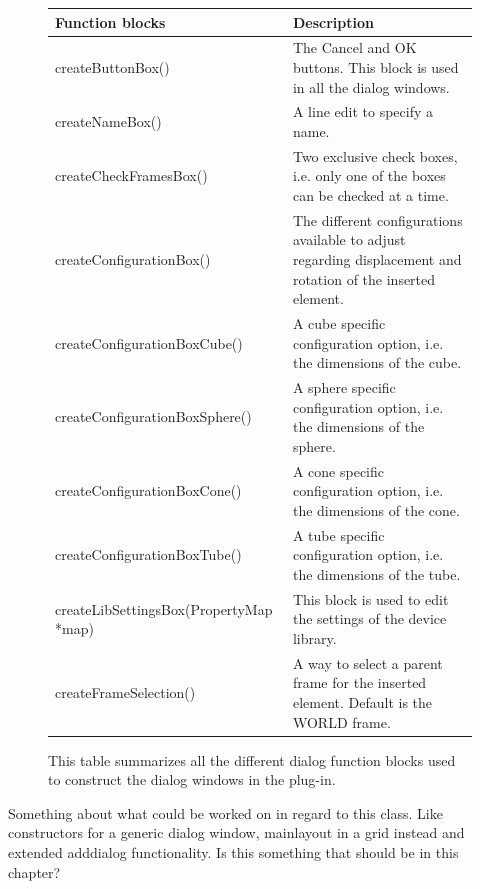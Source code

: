 \begin{figure}[h] %
\centering
\begin{center}
  \begin{tabular}{ | p{6cm} | p{7cm} |}
    \hline
    \textbf{Function blocks} 	   &   \textbf{Description}  \\ \hline
    createButtonBox()			   &   The Cancel and OK buttons. This block is used in all the dialog windows.   		\\ \hline
    createNameBox() 			   &   A line edit to specify a name.   		\\ \hline
    createCheckFramesBox()		   &   Two exclusive check boxes, i.e. only one of the boxes can be checked at a time.		\\ \hline
    createConfigurationBox() 	   &   The different configurations available to adjust regarding displacement and rotation of the inserted element. 		\\ \hline
	createConfigurationBoxCube()   &   A cube specific configuration option, i.e. the dimensions of the cube.  	\\ \hline	    
	createConfigurationBoxSphere() &   A sphere specific configuration option, i.e. the dimensions of the sphere. 	\\ \hline	
	createConfigurationBoxCone()   &   A cone specific configuration option, i.e. the dimensions of the cone.  	\\ \hline	
    createConfigurationBoxTube()   &   A tube specific configuration option, i.e. the dimensions of the tube.  	\\ \hline	
	createLibSettingsBox(PropertyMap *map)		   &   This block is used to edit the settings of the device library.    	\\ \hline	 
	createFrameSelection()		   &   A way to select a parent frame for the inserted element. Default is the WORLD frame.		\\
    \hline
  \end{tabular}
\end{center}
\caption{This table summarizes all the different dialog function blocks used to construct the dialog windows in the plug-in.}
\label{fig:dialogBlocks} 
\end{figure}


Something about what could be worked on in regard to this class. Like constructors for a generic dialog window, mainlayout in a grid instead and extended adddialog functionality.
Is this something that should be in this chapter?


